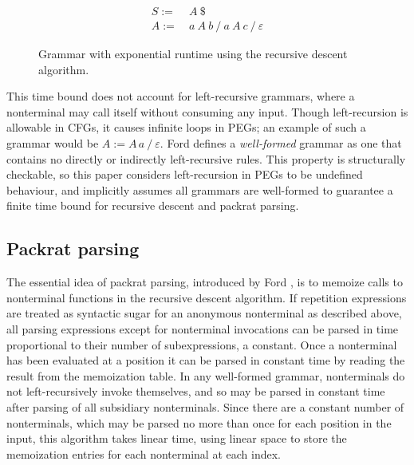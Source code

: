 \documentclass[submission,copyright,creativecommons]{eptcs}
\newcommand{\eosp}{\mathrm{\textit{\$}}}
\begin{document}
\begin{figure}[b]
\centering
\begin{align*}
S := & ~A~\eosp \\
A := & ~a~A~b~/~a~A~c~/~\varepsilon 
\end{align*}
\caption[Exponential-time grammar]{Grammar with exponential runtime using the recursive descent algorithm.}
\label{exp-grammar}
\end{figure}

This time bound does not account for left-recursive grammars, where a nonterminal may call itself without consuming any input. 
Though left-recursion is allowable in CFGs, it causes infinite loops in PEGs; an example of such a grammar would be $A := A\,a\:/\:\varepsilon$. 
Ford \cite{For04} defines a \emph{well-formed} grammar as one that contains no directly or indirectly left-recursive rules. 
This property is structurally checkable, so this paper considers left-recursion in PEGs to be undefined behaviour, and implicitly assumes all grammars are well-formed to guarantee a finite time bound for recursive descent and packrat parsing.

\subsection{Packrat parsing}
The essential idea of packrat parsing, introduced by Ford \cite{For02}, is to memoize calls to nonterminal functions in the recursive descent algorithm. 
If repetition expressions are treated as syntactic sugar for an anonymous nonterminal as described above, all parsing expressions except for nonterminal invocations can be parsed in time proportional to their number of subexpressions, a constant. 
Once a nonterminal has been evaluated at a position it can be parsed in constant time by reading the result from the memoization table. 
In any well-formed grammar, nonterminals do not left-recursively invoke themselves, and so may be parsed in constant time after parsing of all subsidiary nonterminals.
Since there are a constant number of nonterminals, which may be parsed no more than once for each position in the input, this algorithm takes linear time, using linear space to store the memoization entries for each nonterminal at each index.
\end{document}

